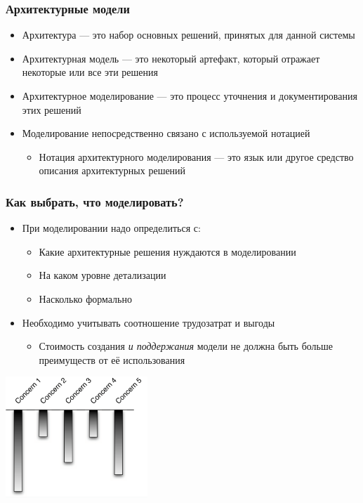 \documentclass{../../slides-style}
\begin{document}
    \begin{frame}
        \frametitle{Архитектурные модели}
        \begin{itemize}
            \item Архитектура --- это набор основных решений, принятых для данной системы
            \item Архитектурная модель --- это некоторый артефакт, который отражает некоторые или все эти решения
            \item Архитектурное моделирование --- это процесс уточнения и документирования этих решений
            \item Моделирование непосредственно связано с используемой нотацией
            \begin{itemize}
                \item Нотация архитектурного моделирования --- это язык или другое средство описания архитектурных решений
            \end{itemize}
        \end{itemize}
    \end{frame}

    \begin{frame}
        \frametitle{Как выбрать, что моделировать?}
        \begin{itemize}
            \item При моделировании надо определиться с:
            \begin{itemize}
                \item Какие архитектурные решения нуждаются в моделировании
                \item На каком уровне детализации
                \item Насколько формально
            \end{itemize}
            \item Необходимо учитывать соотношение трудозатрат и выгоды
            \begin{itemize}
                \item Стоимость создания \textit{и поддержания} модели не должна быть больше преимуществ от её использования
            \end{itemize}
        \end{itemize}
        \begin{center}
            \includegraphics[width=0.4\textwidth]{concerns.png}
        \end{center}
    \end{frame}
\end{document}

